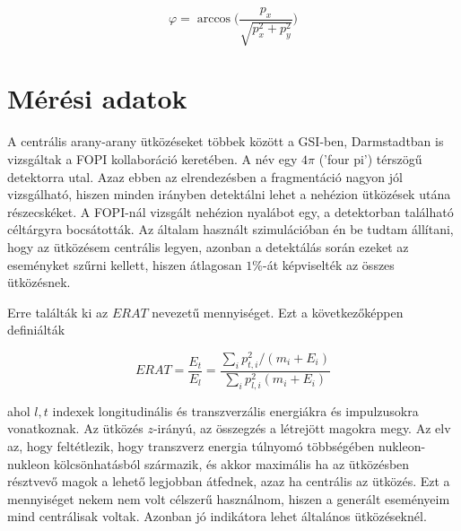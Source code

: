 \documentclass[a4paper,12pt]{article}
\begin{document}
\vspace{5mm}

\begin{equation*}
\varphi = \arccos\Big(\frac{p_{x}}{\sqrt{p_{x}^{2} + p_{y}^{2}}}\Big)
\end{equation*}

\vspace{5mm}

\section{ Mérési adatok}

\par A centrális arany-arany ütközéseket többek között a GSI-ben, Darmstadtban is vizsgáltak a FOPI kollaboráció keretében. A név egy $4\pi$ ('four pi') térszögű detektorra utal. Azaz ebben az elrendezésben a fragmentáció nagyon jól vizsgálható, hiszen minden irányben detektálni lehet a nehézion ütközések utána részecskéket. A FOPI-nál vizsgált nehézion nyalábot egy, a detektorban található céltárgyra bocsátották. Az általam használt szimulációban én be tudtam állítani, hogy az ütközésem centrális legyen, azonban a detektálás során ezeket az eseményket szűrni kellett, hiszen átlagosan $1\%$-át képviselték az összes ütközésnek.

\vspace{5mm}

\par Erre találták ki az $ERAT$ nevezetű mennyiséget. Ezt a következőképpen definiálták

\vspace{5mm}

\begin{equation}
ERAT = \frac{E_{t}}{E_{l}} = \frac{\sum_{i} p_{t,i}^{2}/(m_{i} + E_{i})}{\sum_{i} p_{l,i}^{2}(m_{i} + E_{i})}
\end{equation}

\vspace{5mm}

\par ahol $l,t$ indexek longitudinális és transzverzális energiákra és impulzusokra vonatkoznak. Az ütközés $z$-irányú, az összegzés a létrejött magokra megy. Az elv az, hogy feltétlezik, hogy transzverz energia túlnyomó többségében nukleon-nukleon kölcsönhatásból származik, és akkor maximális ha az ütközésben résztvevő magok a lehető legjobban átfednek, azaz ha centrális az ütközés. Ezt a mennyiséget nekem nem volt célszerű használnom, hiszen a generált eseményeim mind centrálisak voltak. Azonban jó indikátora lehet általános ütközéseknél.
\end{document}
